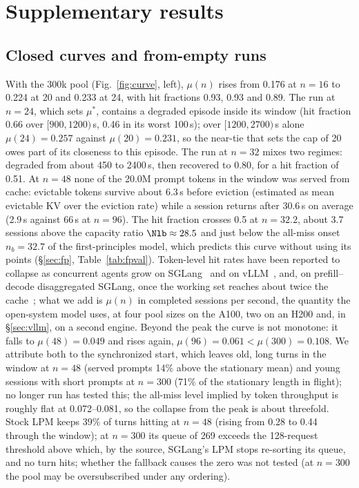 \section{Supplementary results}\label{app:supp}

\subsection{Closed curves and from-empty runs}
With the 300k pool (Fig.~\ref{fig:curve}, left), $\mu(n)$ rises from 0.176\sps{} at $n=16$ to 0.224 at 20 and 0.233 at 24, with hit fractions 0.93, 0.93 and 0.89. The run at $n=24$, which sets $\mu^*$, contains a degraded episode inside its window (hit fraction 0.66 over $[900,1200)$\,s, 0.46 in its worst 100\,s); over $[1200,2700)$\,s alone $\mu(24)=0.257$ against $\mu(20)=0.231$, so the near-tie that sets the cap of 20 owes part of its closeness to this episode. The run at $n=32$ mixes two regimes: degraded from about 450 to 2400\,s, then recovered to 0.80, for a hit fraction of 0.51. At $n=48$ none of the 20.0M prompt tokens in the window was served from cache: evictable tokens survive about 6.3\,s before eviction (estimated as mean evictable KV over the eviction rate) while a session returns after 30.6\,s on average (2.9\,s against 66\,s at $n=96$). The hit fraction crosses 0.5 at $n=32.2$, about 3.7 sessions above the capacity ratio $\Nlb\approx28.5$ and just below the all-miss onset $n_b=32.7$ of the first-principles model, which predicts this curve without using its points (\S\ref{sec:fp}, Table~\ref{tab:fpval}). Token-level hit rates have been reported to collapse as concurrent agents grow on SGLang~\citep{chen2026concur} and on vLLM~\citep{yuan2026agentic,hong2026misat}, and, on prefill--decode disaggregated SGLang, once the working set reaches about twice the cache~\citep{lu2026cachetrap}; what we add is $\mu(n)$ in completed sessions per second, the quantity the open-system model uses, at four pool sizes on the A100, two on an H200 and, in \S\ref{sec:vllm}, on a second engine. Beyond the peak the curve is not monotone: it falls to $\mu(48)=0.049$\sps{} and rises again, $\mu(96)=0.061<\mu(300)=0.108$\sps. We attribute both to the synchronized start, which leaves old, long turns in the window at $n=48$ (served prompts 14\% above the stationary mean) and young sessions with short prompts at $n=300$ (71\% of the stationary length in flight); no longer run has tested this; the all-miss level implied by token throughput is roughly flat at 0.072--0.081\sps, so the collapse from the peak is about threefold. Stock LPM keeps 39\% of turns hitting at $n=48$ (rising from 0.28 to 0.44 through the window); at $n=300$ its queue of 269 exceeds the 128-request threshold above which, by the source, SGLang's LPM stops re-sorting its queue, and no turn hits; whether the fallback causes the zero was not tested (at $n=300$ the pool may be oversubscribed under any ordering).

